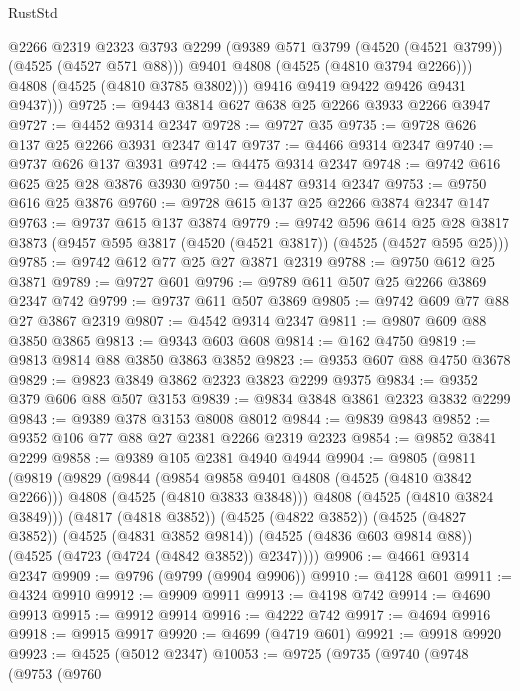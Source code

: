 \begin{lexlean}{RustStd}
\begin{coremodule}
{\begin{coremodule}
{{{{{{{{{{{{{{              @2266
              @2319
              @2323
              @3793
              @2299
              (@9389 @571 @3799 (@4520 (@4521 @3799)) (@4525 (@4527 @571 @88)))
              @9401
              @4808
              (@4525 (@4810 @3794 @2266)))
            @4808
            (@4525 (@4810 @3785 @3802)))
          @9416
          @9419
          @9422
          @9426
          @9431
          @9437)))
@9725 := @9443 @3814 @627 @638 @25 @2266 @3933 @2266 @3947
@9727 := @4452 @9314 @2347
@9728 := @9727 @35
@9735 := @9728 @626 @137 @25 @2266 @3931 @2347 @147
@9737 := @4466 @9314 @2347
@9740 := @9737 @626 @137 @3931
@9742 := @4475 @9314 @2347
@9748 := @9742 @616 @625 @25 @28 @3876 @3930
@9750 := @4487 @9314 @2347
@9753 := @9750 @616 @25 @3876
@9760 := @9728 @615 @137 @25 @2266 @3874 @2347 @147
@9763 := @9737 @615 @137 @3874
@9779 := @9742
    @596
    @614
    @25
    @28
    @3817
    @3873
    (@9457 @595 @3817 (@4520 (@4521 @3817)) (@4525 (@4527 @595 @25)))
@9785 := @9742 @612 @77 @25 @27 @3871 @2319
@9788 := @9750 @612 @25 @3871
@9789 := @9727 @601
@9796 := @9789 @611 @507 @25 @2266 @3869 @2347 @742
@9799 := @9737 @611 @507 @3869
@9805 := @9742 @609 @77 @88 @27 @3867 @2319
@9807 := @4542 @9314 @2347
@9811 := @9807 @609 @88 @3850 @3865
@9813 := @9343 @603 @608
@9814 := @162 @4750
@9819 := @9813 @9814 @88 @3850 @3863 @3852
@9823 := @9353 @607 @88 @4750 @3678
@9829 := @9823 @3849 @3862 @2323 @3823 @2299 @9375
@9834 := @9352 @379 @606 @88 @507 @3153
@9839 := @9834 @3848 @3861 @2323 @3832 @2299
@9843 := @9389 @378 @3153 @8008 @8012
@9844 := @9839 @9843
@9852 := @9352 @106 @77 @88 @27 @2381 @2266 @2319 @2323
@9854 := @9852 @3841 @2299
@9858 := @9389 @105 @2381 @4940 @4944
@9904 := @9805
    (@9811
      (@9819
        (@9829
          (@9844
            (@9854 @9858 @9401 @4808 (@4525 (@4810 @3842 @2266)))
            @4808
            (@4525 (@4810 @3833 @3848)))
          @4808
          (@4525 (@4810 @3824 @3849)))
        (@4817 (@4818 @3852))
        (@4525 (@4822 @3852))
        (@4525 (@4827 @3852))
        (@4525 (@4831 @3852 @9814))
        (@4525 (@4836 @603 @9814 @88))
        (@4525 (@4723 (@4724 (@4842 @3852)) @2347))))
@9906 := @4661 @9314 @2347
@9909 := @9796 (@9799 (@9904 @9906))
@9910 := @4128 @601
@9911 := @4324 @9910
@9912 := @9909 @9911
@9913 := @4198 @742
@9914 := @4690 @9913
@9915 := @9912 @9914
@9916 := @4222 @742
@9917 := @4694 @9916
@9918 := @9915 @9917
@9920 := @4699 (@4719 @601)
@9921 := @9918 @9920
@9923 := @4525 (@5012 @2347)
@10053 := @9725
    (@9735
      (@9740
        (@9748
          (@9753
            (@9760
}}}}}}}}}}}}}}
\end{coremodule}}
\end{coremodule}
\end{lexlean}
